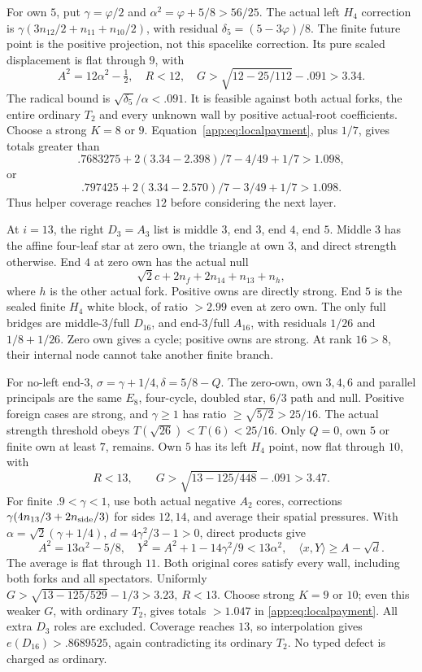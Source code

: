 \documentclass[11pt]{article}
\theoremstyle{definition}
\theoremstyle{remark}
\newcommand{\ip}[2]{\langle #1,#2\rangle}
\begin{document}
For own \(5\), put \(\gamma=\varphi/2\) and
\(\alpha^2=\varphi+5/8>56/25\).
The actual left \(H_4\) correction is
\(\gamma(3n_{12}/2+n_{11}+n_{10}/2)\),
with residual \(\delta_5=(5-3\varphi)/8\).
The finite future point is the positive
projection, not this spacelike correction.
Its pure scaled displacement is flat
through \(9\), with
\[
 A^2=12\alpha^2-\tfrac12,\quad
 R<12,\quad
 G>\sqrt{12-25/112}-.091>3.34.
\]
The radical bound is
\(\sqrt{\delta_5}/\alpha<.091\).
It is feasible against both actual forks,
the entire ordinary \(T_2\) and every unknown
wall by positive actual-root coefficients.
Choose a strong \(K=8\) or \(9\).
Equation~\eqref{app:eq:localpayment}, plus \(1/7\),
gives totals greater than
\[
 .7683275+2(3.34-2.398)/7-4/49+1/7>1.098,
\]
or
\[
 .797425+2(3.34-2.570)/7-3/49+1/7>1.098.
\]
Thus helper coverage reaches \(12\) before
considering the next layer.

At \(i=13\), the right \(D_3=A_3\) list is
middle \(3\), end \(3\), end \(4\), end \(5\).
Middle \(3\) has the affine four-leaf star
at zero own, the triangle at own \(3\),
and direct strength otherwise.
End \(4\) at zero own has the actual null
\[
 \sqrt2c+2n_f+2n_{14}+n_{13}+n_h,
\]
where \(h\) is the other actual fork.
Positive owns are directly strong.
End \(5\) is the sealed finite \(H_4\)
white block, of ratio \(>2.99\) even at
zero own.
The only full bridges are middle-\(3\)/full
\(D_{16}\), and end-\(3\)/full \(A_{16}\),
with residuals \(1/26\) and \(1/8+1/26\).
Zero own gives a cycle; positive owns are
strong. At rank \(16>8\), their internal
node cannot take another finite branch.

For no-left end-\(3\),
\(\sigma=\gamma+1/4,\delta=5/8-Q\).
The zero-own, own \(3,4,6\) and parallel
principals are the same \(E_8\), four-cycle,
doubled star, \(6/3\) path and null.
Positive foreign cases are strong, and
\(\gamma\geq1\) has ratio
\(\geq\sqrt{5/2}>25/16\).
The actual strength threshold obeys
\(T(\sqrt{26})<T(6)<25/16\).
Only \(Q=0\), own \(5\) or finite own
at least \(7\), remains.
Own \(5\) has its left \(H_4\) point,
now flat through \(10\), with
\[
 R<13,\qquad
 G>\sqrt{13-125/448}-.091>3.47.
\]
For finite \(.9<\gamma<1\), use both
actual negative \(A_2\) cores, corrections
\(\gamma(4n_{13}/3+2n_{\rm side}/3)\)
for sides \(12,14\), and average their
spatial pressures. With
\(\alpha=\sqrt2(\gamma+1/4)\),
\(d=4\gamma^2/3-1>0\), direct products give
\[
 A^2=13\alpha^2-5/8,\quad
 Y^2=A^2+1-14\gamma^2/9<13\alpha^2,\quad
 \ip{x}{Y}\geq A-\sqrt d.
\]
The average is flat through \(11\).
Both original cores satisfy every wall,
including both forks and all spectators.
Uniformly
\(G>\sqrt{13-125/529}-1/3>3.23,\ R<13\).
Choose strong \(K=9\) or \(10\);
even this weaker \(G\), with ordinary
\(T_2\), gives totals \(>1.047\) in
\eqref{app:eq:localpayment}.
All extra \(D_3\) roles are excluded.
Coverage reaches \(13\), so interpolation
gives \(e(D_{16})>.8689525\), again
contradicting its ordinary \(T_2\).
No typed defect is charged as ordinary.
\end{document}
